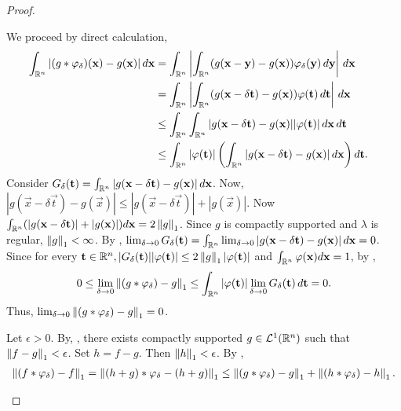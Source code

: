 \begin{proof}
\begin{step}[Proof of $2$]
We proceed by direct calculation, 
\begin{align*}
    \int_{{\mathbb R}^n} | (g \ast \varphi_\delta) (\mathbf{x}) - g(\mathbf{x}) | \, d\mathbf{x}&= \int_{{\mathbb R}^n} \left |     \int_{{\mathbb R}^n} (g (\mathbf{x} - \mathbf{y}) - g(\mathbf{x})) \varphi_\delta(\mathbf{y}) \,d\mathbf{y}  \right | \, d\mathbf{x} & \\
    &= \int_{{\mathbb R}^n} \left | \int_{{\mathbb R}^n} (g (\mathbf{x} -\delta \mathbf{t}) - g(\mathbf{x})) \varphi(\mathbf{t}) \,d\mathbf{t}  \right | \, d\mathbf{x}& \\
    &\leq \int_{{\mathbb R}^n} \int_{{\mathbb R}^n} | g (\mathbf{x} - \delta \mathbf{t}) - g(\mathbf{x})| |\varphi(\mathbf{t}) | \, d\mathbf{x}\,d\mathbf{t} & \\ 
    &\leq \int_{{\mathbb R}^n} |\varphi(\mathbf{t})| \left ( \int_{{\mathbb R}^n} |g (\mathbf{x} - \delta \mathbf{t}) - g(\mathbf{x})| \, d\mathbf{x}\right)d\mathbf{t}.
\end{align*}
Consider $G_\delta (\mathbf{t}) =  \int_{{\mathbb R}^n} |g (\mathbf{x} - \delta \mathbf{t}) - g(\mathbf{x})| \, d\mathbf{x}$. Now, $|g (\vec{x} - \delta \vec{t}) - g(\vec{x})| \leq |g(\vec{x} - \delta \vec{t})| + |g(\vec{x})| $.
Now $\int_{{\mathbb R}^n} (|g(\mathbf{x} - \delta \mathbf{t})| + |g(\mathbf{x})|)d\mathbf{x}= 2 \left\lVert g\right\rVert_1$.
Since $g$ is compactly supported and $\lambda$ is regular, $\left\lVert g\right\rVert_1 < \infty$. By , $\lim_{\delta \to 0} G_\delta(\mathbf{t}) = \int_{{\mathbb R}^n} \lim_{\delta \to 0} |g (\mathbf{x} - \delta \mathbf{t}) - g(\mathbf{x})| \, d\mathbf{x}= 0$. Since for every $\mathbf{t} \in {\mathbb R}^n, | G_\delta (\mathbf{t}) | | \varphi(\mathbf{t})| \leq 2 \left\lVert g\right\rVert_1 | \varphi(\mathbf{t})|$ and $\int_{{\mathbb R}^n} \varphi(\mathbf{x}) d\mathbf{x}= 1$, by , \begin{align*}
    0 \leq \lim_{\delta \to 0} \left\lVert (g \ast \varphi_\delta) - g\right\rVert_1 \leq  \int_{{\mathbb R}^n} |\varphi(\mathbf{t})| \lim_{\delta \to 0}  G_\delta(\mathbf{t}) \,d\mathbf{t} = 0.
\end{align*}
Thus, $ \lim_{\delta \to 0} \left\lVert (g \ast \varphi_\delta) - g\right\rVert_1 = 0$.
\end{step}
\begin{step}[Proof of $3$]
    Let $\epsilon > 0$. By, , there exists compactly supported $g \in {\mathcal {L}^1}({\mathbb R}^n)$ such that $\left\lVert f - g\right\rVert_1 < \epsilon$. Set $h = f - g$. Then $\left\lVert h\right\rVert_1 < \epsilon$. By , 
    \begin{align}
        \label{lemma:fourier:approxident:ineqn1}
        \norm{(f \ast \varphi_\delta) - f }_1 = \norm{(h + g) \ast \varphi_\delta - (h + g)}_1 \leq  \norm{(g \ast \varphi_\delta) - g}_1 + \norm{(h \ast \varphi_\delta) - h}_1.

\end{align}
\end{step}
\end{proof}
